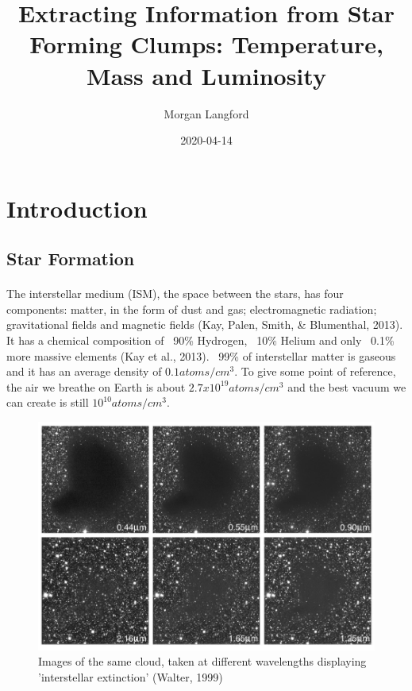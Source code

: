 \documentclass{article}
\title{Extracting Information from Star Forming Clumps: Temperature, Mass and Luminosity}
\date{2020-04-14}
\author{Morgan Langford}
\begin{document}
\maketitle
\newpage
{}

\section{Introduction}
\subsection{Star Formation}
\paragraph{}
The interstellar medium (ISM), the space between the stars, has four components: matter, in the form of dust and gas; electromagnetic radiation; gravitational fields and magnetic fields (Kay, Palen, Smith, \& Blumenthal, 2013). It has a chemical composition of ~90\% Hydrogen, ~10\% Helium and only ~0.1\% more massive elements (Kay et al., 2013). ~99\% of interstellar matter is gaseous and it has an average density of $0.1 atoms/cm^3$. To give some point of reference, the air we breathe on Earth is about $2.7 x 10^{19} atoms/cm^3$ and the best vacuum we can create is still $10^{10} atoms/cm^3$. 

\begin{figure}[h!]
\includegraphics[width=\linewidth]{dust.jpg}
\caption{Images of the same cloud, taken at different wavelengths displaying 'interstellar extinction' (Walter, 1999)}
\label{fig:dust1}
\end{figure}
\end{document}
